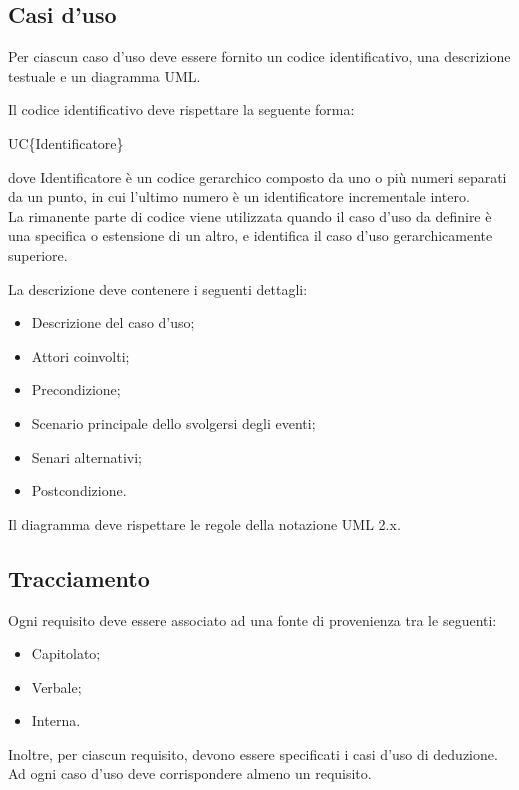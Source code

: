 \subsection{Casi d'uso}
Per ciascun caso d'uso deve essere fornito un codice identificativo, una descrizione testuale e un diagramma UML.

\begin{flushleft}
Il codice identificativo deve rispettare la seguente forma:
\end{flushleft}

\begin{center}UC\{Identificatore\}\end{center}
dove Identificatore è un codice gerarchico composto da uno o più numeri separati da un punto, in cui l'ultimo numero è un identificatore incrementale intero.\\
La rimanente parte di codice viene utilizzata quando il caso d'uso da definire è una specifica o estensione di un altro, e identifica il caso d'uso gerarchicamente superiore.

\begin{flushleft}
La descrizione deve contenere i seguenti dettagli:
\end{flushleft}

\begin{itemize}
\item Descrizione del caso d'uso;
\item Attori coinvolti;
\item Precondizione;
\item Scenario principale dello svolgersi degli eventi;
\item Senari alternativi;
\item Postcondizione.
\end{itemize}

\begin{flushleft}
Il diagramma deve rispettare le regole della notazione UML 2.x.
\end{flushleft}

\subsection{Tracciamento}
Ogni requisito deve essere associato ad una fonte di provenienza tra le seguenti:

\begin{itemize}
\item Capitolato;
\item Verbale;
\item Interna.
\end{itemize}
Inoltre, per ciascun requisito, devono essere specificati i casi d'uso di deduzione.\\
Ad ogni caso d'uso deve corrispondere almeno un requisito.